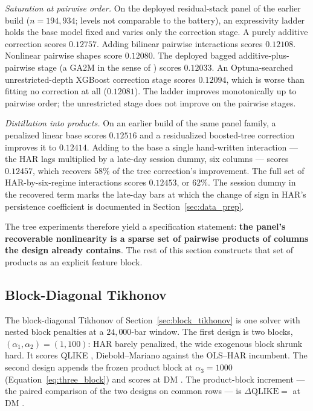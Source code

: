 \emph{Saturation at pairwise order.} On the deployed residual-stack panel
of the earlier build ($n = 194{,}934$; levels not comparable to the
battery), an expressivity ladder holds the base model fixed and varies only
the correction stage. A purely additive correction scores $0.12757$.
Adding bilinear pairwise interactions scores $0.12108$. Nonlinear pairwise
shapes score $0.12080$. The deployed bagged additive-plus-pairwise stage (a
GA2M in the sense of \citealt{Lou2013}) scores $0.12033$. An
Optuna-searched unrestricted-depth XGBoost correction stage scores
$0.12094$, which is worse than fitting no correction at all ($0.12081$).
The ladder improves monotonically up to pairwise order; the unrestricted
stage does not improve on the pairwise stages.

\emph{Distillation into products.} On an earlier build of the same panel
family, a penalized linear base scores $0.12516$ and a residualized
boosted-tree correction improves it to $0.12414$. Adding to the base a
single hand-written interaction --- the HAR lags multiplied by a late-day
session dummy, six columns --- scores $0.12457$, which recovers $58\%$ of
the tree correction's improvement. The full set of HAR-by-six-regime
interactions scores $0.12453$, or $62\%$. The session dummy in the
recovered term marks the late-day bars at which the change of sign in
HAR's persistence coefficient is documented in
Section~\ref{sec:data_prep}.

The tree experiments therefore yield a specification statement:
\textbf{the panel's recoverable nonlinearity is a sparse set of pairwise
products of columns the design already contains}. The rest of this section
constructs that set of products as an explicit feature block.

\subsection{Block-Diagonal Tikhonov}
\label{sec:three_block_results}
\label{sec:hierarchical_ridge_results}
\label{sec:block_tikhonov_results}

The block-diagonal Tikhonov of Section~\ref{sec:block_tikhonov} is one
solver with nested block penalties at a $24{,}000$-bar window. The
first design is two blocks, $(\alpha_1,\alpha_2)=(1,100)$: HAR barely
penalized, the wide exogenous block shrunk hard. It scores QLIKE
\unifBlkTwoUserQLIKE{}, Diebold--Mariano \unifBlkTwoUserDM{} against
the OLS--HAR incumbent. The second design appends the frozen product
block at $\alpha_3 = 1000$ (Equation~\eqref{eq:three_block}) and
scores \unifBlkThreeUserQLIKE{} at DM \unifBlkThreeUserDM{}. The
product-block increment --- the paired comparison of the two designs on
common rows --- is $\Delta\mathrm{QLIKE} = $ \unifIncrBlkThreeUserDQ{}
at DM \unifIncrBlkThreeUserDM{}.

